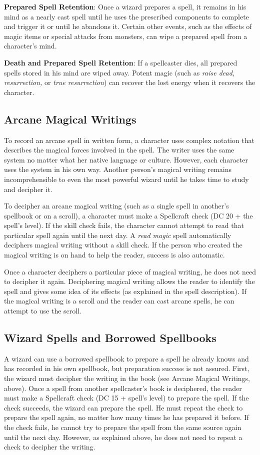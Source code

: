 \textbf{Prepared Spell Retention}: Once a wizard prepares a spell, it remains in his mind as a nearly cast spell until he uses the prescribed components to complete and trigger it or until he abandons it. Certain other events, such as the effects of magic items or special attacks from monsters, can wipe a prepared spell from a character's mind.
				
\textbf{Death and Prepared Spell Retention}: If a spellcaster dies, all prepared spells stored in his mind are wiped away. Potent magic (such as \textit{raise dead, resurrection, }or \textit{true resurrection}) can recover the lost energy when it recovers the character.
				
\subsection{Arcane Magical Writings}

				
To record an arcane spell in written form, a character uses complex notation that describes the magical forces involved in the spell. The writer uses the same system no matter what her native language or culture. However, each character uses the system in his own way. Another person's magical writing remains incomprehensible to even the most powerful wizard until he takes time to study and decipher it.
				
To decipher an arcane magical writing (such as a single spell in another's spellbook or on a scroll), a character must make a Spellcraft check (DC 20 + the spell's level). If the skill check fails, the character cannot attempt to read that particular spell again until the next day. A \textit{read magic }spell automatically deciphers magical writing without a skill check. If the person who created the magical writing is on hand to help the reader, success is also automatic.
				
Once a character deciphers a particular piece of magical writing, he does not need to decipher it again. Deciphering magical writing allows the reader to identify the spell and gives some idea of its effects (as explained in the spell description). If the magical writing is a scroll and the reader can cast arcane spells, he can attempt to use the scroll.
				
\subsection{Wizard Spells and Borrowed Spellbooks}

				
A wizard can use a borrowed spellbook to prepare a spell he already knows and has recorded in his own spellbook, but preparation success is not assured. First, the wizard must decipher the writing in the book (see Arcane Magical Writings, above). Once a spell from another spellcaster's book is deciphered, the reader must make a Spellcraft check (DC 15 + spell's level) to prepare the spell. If the check succeeds, the wizard can prepare the spell. He must repeat the check to prepare the spell again, no matter how many times he has prepared it before. If the check fails, he cannot try to prepare the spell from the same source again until the next day. However, as explained above, he does not need to repeat a check to decipher the writing.
				
